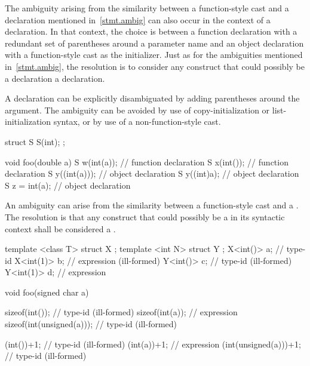 \pnum
The ambiguity arising from the similarity between a function-style cast and
a declaration mentioned in~\ref{stmt.ambig} can also occur in the context of a declaration.
In that context, the choice is between a function declaration with
a redundant set of parentheses around a parameter name and an object declaration
with a function-style cast as the initializer.
Just as for the ambiguities mentioned in~\ref{stmt.ambig},
the resolution is to consider any construct that could possibly
be a declaration a declaration.
\begin{note}
A declaration can be explicitly disambiguated by adding parentheses
around the argument.
The ambiguity can be avoided by use of copy-initialization or
list-initialization syntax, or by use of a non-function-style cast.
\end{note}
\begin{example}
\begin{codeblock}
struct S {
  S(int);
};

void foo(double a) {
  S w(int(a));                  // function declaration
  S x(int());                   // function declaration
  S y((int(a)));                // object declaration
  S y((int)a);                  // object declaration
  S z = int(a);                 // object declaration
}
\end{codeblock}
\end{example}

\pnum
An ambiguity can arise from the similarity between a function-style
cast and a
.
The resolution is that any construct that could possibly be a
in its syntactic context shall be considered a
.
\begin{example}

\begin{codeblock}
template <class T> struct X {};
template <int N> struct Y {};
X<int()> a;                     // type-id
X<int(1)> b;                    // expression (ill-formed)
Y<int()> c;                     // type-id (ill-formed)
Y<int(1)> d;                    // expression

void foo(signed char a) {
  sizeof(int());                // type-id (ill-formed)
  sizeof(int(a));               // expression
  sizeof(int(unsigned(a)));     // type-id (ill-formed)

  (int())+1;                    // type-id (ill-formed)
  (int(a))+1;                   // expression
  (int(unsigned(a)))+1;         // type-id (ill-formed)
}
\end{codeblock}
\end{example}

